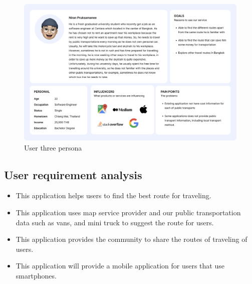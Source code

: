 \begin{figure}[!h]
    \centering
    \includegraphics[width=1\linewidth]{chapter3/user-persona-3.png}
    \caption{User three persona}
    \label{fig:User three persona}
\end{figure}
\subsection{User requirement analysis}
\begin{itemize}
    \item This application helps users to find the best route for traveling.
    \item This application uses map service provider and our public transportation data such as vans, and mini truck to suggest the route for users.
    \item This application provides the community to share the routes of traveling of users.
    \item This application will provide a mobile application for users that use smartphones.
\end{itemize}

